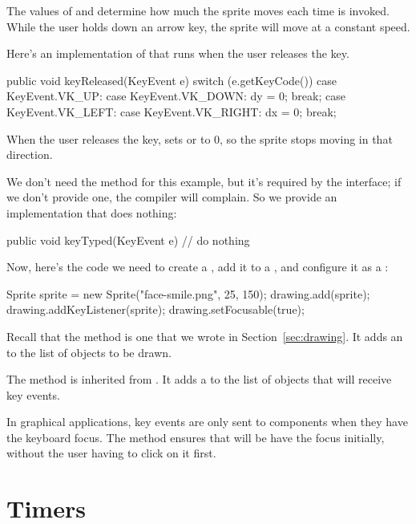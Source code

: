 The values of  and  determine how much the sprite moves each time  is invoked.
While the user holds down an arrow key, the sprite will move at a constant speed.

Here's an implementation of  that runs when the user releases the key.

\begin{code}
public void keyReleased(KeyEvent e) {
    switch (e.getKeyCode()) {
        case KeyEvent.VK_UP:
        case KeyEvent.VK_DOWN:
            dy = 0;
            break;
        case KeyEvent.VK_LEFT:
        case KeyEvent.VK_RIGHT:
            dx = 0;
            break;
    }
}
\end{code}

When the user releases the key,  sets  or  to 0, so the sprite stops moving in that direction.

We don't need the  method for this example, but it's required by the interface; if we don't provide one, the compiler will complain.
So we provide an implementation that does nothing:

\begin{code}
public void keyTyped(KeyEvent e) {
    // do nothing
}
\end{code}

Now, here's the code we need to create a , add it to a , and configure it as a :

\begin{code}
Sprite sprite = new Sprite("face-smile.png", 25, 150);
drawing.add(sprite);
drawing.addKeyListener(sprite);
drawing.setFocusable(true);
\end{code}

Recall that the  method is one that we wrote in Section~\ref{sec:drawing}.
It adds an  to the list of objects to be drawn.

The  method is inherited from .
It adds a  to the list of objects that will receive key events.

In graphical applications, key events are only sent to components when they have the keyboard focus.
The  method ensures that  will be have the focus initially, without the user having to click on it first.


\section{Timers}

